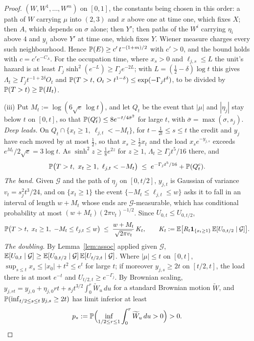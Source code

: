 \begin{proof}
$(W,W^1,\dots,W^m)$ on $[0,1]$, the constants being chosen in this order:
a path of $W$ carrying $\mu$ into $(2,3)$ and $x$ above one at time one,
which fixes $X$; then $A$, which depends on $\sigma$ alone; then $Y'$;
then paths of the $W^i$ carrying $\eta_i$ above $4$ and $y_i$ above $Y'$
at time one, which fixes $Y$. Wiener measure charges every such
neighbourhood. Hence $\mathbb{P}(E)\ge c'\,t^{-(1+m)/2}$ with $c'>0$, and the
bound holds with $c=c'e^{-C_\Lambda}$. For the occupation time, where
$x_s>0$ and $\ell_{j,s}\le L$ the unit's hazard is at least
$\Gamma_j\sinh^2(e^{-L})\ge\Gamma_je^{-2L}$; with
$L=(\tfrac12-\delta)\log t$ this gives
$\Lambda_t\ge\Gamma_jt^{-1+2\delta}O_t$ and
$\mathbb{P}(T>t,\,O_t>t^{1-\delta})\le\exp(-\Gamma_jt^{\delta})$, to be divided
by $\mathbb{P}(T>t)\ge\mathbb{P}(H_t)$.

(iii) Put $M_t:=\log(6\sqrt e\,\log t)$, and let $Q_t$ be the event that
$|\mu|$ and $|\eta_j|$ stay below $t$ on $[0,t]$, so that
$\mathbb{P}(Q_t^c)\le8e^{-t/4\bar\sigma^2}$ for large $t$, with
$\bar\sigma=\max(\sigma,s_j)$. \emph{Deep leads.} On
$Q_t\cap\{x_t\ge1,\ \ell_{j,t}<-M_t\}$, for $t-\tfrac1{2t}\le s\le t$ the
credit and $y_j$ have each moved by at most $\tfrac12$, so that
$x_s\ge\tfrac12x_t$ and the load $x_se^{-y_{j,s}}$ exceeds
$e^{M_t}/2\sqrt e=3\log t$. As $\sinh^2z\ge\tfrac18e^{2z}$ for $z\ge1$,
$\Lambda_t\ge\Gamma_jt^5/16$ there, and
\[
\PP\bigl(T>t,\ x_t\ge1,\ \ell_{j,t}<-M_t\bigr)\;\le\;e^{-\Gamma_jt^5/16}+\PP(Q_t^c).
\]
\emph{The band.} Given $\mathcal G$ and the path of $\eta_j$ on
$[0,t/2]$, $y_{j,t}$ is Gaussian of variance $v_t=s_j^2t^3/24$, and on
$\{x_t\ge1\}$ the event $\{-M_t\le\ell_{j,t}\le w\}$ asks it to fall in an
interval of length $w+M_t$ whose ends are $\mathcal G$-measurable, which
has conditional probability at most $(w+M_t)(2\pi v_t)^{-1/2}$. Since
$U_{0,t}\le U_{0,t/2}$,
\[
\PP\bigl(T>t,\ x_t\ge1,\ -M_t\le\ell_{j,t}\le w\bigr)\;\le\;
\frac{w+M_t}{\sqrt{2\pi v_t}}\,K_t,\qquad
K_t:=\E\bigl[R_t\one_{\{x_t\ge1\}}\,\E[U_{0,t/2}\mid\mathcal G]\bigr].
\]
\emph{The doubling.} By Lemma~\ref{lem:assoc} applied given $\mathcal G$,
$\mathbb{E}[U_{0,t}\mid\mathcal G]\ge\mathbb{E}[U_{0,t/2}\mid\mathcal G]\,
\mathbb{E}[U_{t/2,t}\mid\mathcal G]$. Where $|\mu|\le t$ on $[0,t]$,
$\sup_{s\le t}x_s\le|x_0|+t^2\le e^t$ for large $t$; if moreover
$y_{j,s}\ge2t$ on $[t/2,t]$, the load there is at most $e^{-t}$ and
$U_{t/2,t}\ge e^{-\Gamma_j}$. By Brownian scaling,
$y_{j,rt}=y_{j,0}+\eta_{j,0}rt+s_jt^{3/2}\int_0^r\widetilde W_u\,du$ for a
standard Brownian motion $\widetilde W$, and
$\mathbb{P}(\inf_{t/2\le s\le t}y_{j,s}\ge2t)$ has limit inferior at least
\[
p_*:=\mathbb{P}\Bigl(\inf_{1/2\le r\le1}\int_0^r\widetilde W_u\,du>0\Bigr)>0.
\]
\end{proof}
